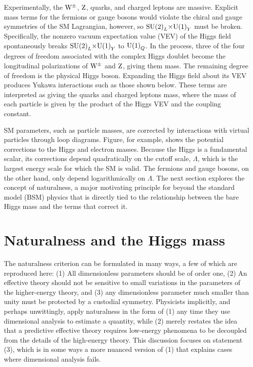 \documentclass[12pt]{article}
\begin{document}
    Experimentally, the $\mathrm{W}^\pm$, $\mathrm{Z}$, quarks, and charged leptons are massive. Explicit mass terms for the fermions or gauge bosons would violate the chiral and gauge symmetries of the SM Lagrangian, however, so $\mathrm{SU} {{\left(2\right)}}_L {\times} \mathrm{U} {\left(1\right)}_Y$ must be broken. Specifically, the nonzero vacuum expectation value (VEV) of the Higgs field spontaneously breaks $\mathrm{SU} {{\left(2\right)}}_L {\times} \mathrm{U} {\left(1\right)}_Y$ to $\mathrm{U} {\left(1\right)}_Q$. In the process, three of the four degrees of freedom associated with the complex Higgs doublet become the longitudinal polarizations of $\mathrm{W}^\pm$ and $\mathrm{Z}$, giving them mass. The remaining degree of freedom is the physical Higgs boson. Expanding the Higgs field about its VEV produces Yukawa interactions such as those shown below. These terms are interpreted as giving the quarks and charged leptons mass, where the mass of each particle is given by the product of the Higgs VEV and the coupling constant.


    SM parameters, such as particle masses, are corrected by interactions with virtual particles through loop diagrams. Figure, for example, shows the potential corrections to the Higgs and electron masses. Because the Higgs is a fundamental scalar, its corrections depend quadratically on the cutoff scale, $\Lambda$, which is the largest energy scale for which the SM is valid. The fermions and gauge bosons, on the other hand, only depend logarithmically on $\Lambda$. The next section explores the concept of naturalness, a major motivating principle for beyond the standard model (BSM) physics that is directly tied to the relationship between the bare Higgs mass and the terms that correct it.


\section{Naturalness and the Higgs mass}

    The naturalness criterion can be formulated in many ways, a few of which are reproduced here: (1) All dimensionless parameters should be of order one, (2) An effective theory should not be sensitive to small variations in the parameters of the higher-energy theory, and (3) any dimensionless parameter much smaller than unity must be protected by a custodial symmetry. Physicists implicitly, and perhaps unwittingly, apply naturalness in the form of (1) any time they use dimensional analysis to estimate a quantity, while (2) merely restates the idea that a predictive effective theory requires low-energy phenomena to be decoupled from the details of the high-energy theory. This discussion focuses on statement (3), which is in some ways a more nuanced version of (1) that explains cases where dimensional analysis fails.
\end{document}
